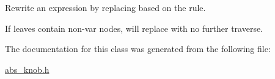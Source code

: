 Rewrite an expression by replacing based on the rule. 


\begin{DoxyItemize}
\item If leaves contain non-\/var nodes, will replace with no further traverse. 
\end{DoxyItemize}

The documentation for this class was generated from the following file\+:\begin{DoxyCompactItemize}
\item 
\mbox{\hyperlink{abs__knob_8h}{abs\+\_\+knob.\+h}}\end{DoxyCompactItemize}
